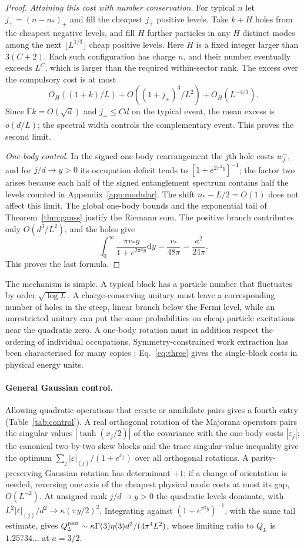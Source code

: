 \documentclass[11pt,a4paper]{article}
\theoremstyle{remark}
\newcommand{\E}{\mathbb E}
\newcommand{\dd}{\mathrm d}
\begin{document}
\begin{proof}
\emph{Attaining this cost with number conservation.} For typical $n$ let $j_+=(n-n_*)_+$ and fill the cheapest $j_+$ positive levels. Take $k+H$ holes from the cheapest negative levels, and fill $H$ further particles in any $H$ distinct modes among the next $\lfloor L^{1/3}\rfloor$ cheap positive levels. Here $H$ is a fixed integer larger than $3(C+2)$. Each such configuration has charge $n$, and their number eventually exceeds $L^C$, which is larger than the required within-sector rank. The excess over the compulsory cost is at most
\[
 O_H((1+k)/L)+O((1+j_+)^3/L^2)+O_H(L^{-4/3}).
\]
Since $\E k=O(\sqrt d)$ and $j_+\le Cd$ on the typical event, the mean excess is $o(d/L)$; the spectral width controls the complementary event. This proves the second limit.

\emph{One-body control.} In the signed one-body rearrangement the $j$th hole costs $w_j^-$, and for $j/d\to y>0$ its occupation deficit tends to $[1+e^{2\pi^2 y}]^{-1}$; the factor two arises because each half of the signed entanglement spectrum contains half the levels counted in Appendix~\ref{app:modular}. The shift $n_*-L/2=O(1)$ does not affect this limit. The global one-body bounds and the exponential tail of Theorem~\ref{thm:gauss} justify the Riemann sum. The positive branch contributes only $O(d^3/L^2)$, and the holes give
\[
 \int_0^\infty\frac{\pi v_* y}{1+e^{2\pi^2 y}}\dd y=\frac{v_*}{48\pi}=\frac{a^2}{24\pi}.
\]
This proves the last formula.
\end{proof}

The mechanism is simple. A typical block has a particle number that fluctuates by order $\sqrt{\log L}$. A charge-conserving unitary must leave a corresponding number of holes in the steep, linear branch below the Fermi level, while an unrestricted unitary can put the same probabilities on cheap particle excitations near the quadratic zero. A one-body rotation must in addition respect the ordering of individual occupations. Symmetry-constrained work extraction has been characterised for many copies \cite{mitsu}; Eq.~\eqref{eq:three} gives the single-block costs in physical energy units.

\paragraph{General Gaussian control.} Allowing quadratic operations that create or annihilate pairs gives a fourth entry (Table~\ref{tab:control}). A real orthogonal rotation of the Majorana operators pairs the singular values $|\tanh(x_j/2)|$ of the covariance with the one-body costs $|\varepsilon_j|$; the canonical two-by-two skew blocks and the trace singular-value inequality give the optimum $\sum_j |\varepsilon|_{(j)}/(1+e^{x_j})$ over all orthogonal rotations. A parity-preserving Gaussian rotation has determinant $+1$; if a change of orientation is needed, reversing one axis of the cheapest physical mode costs at most its gap, $O(L^{-2})$. At unsigned rank $j/d\to y>0$ the quadratic levels dominate, with $L^2 |\varepsilon|_{(j)}/d^2\to\kappa(\pi y/2)^2$. Integrating against $(1+e^{\pi^2 y})^{-1}$, with the same tail estimate, gives $Q_L^{\rm pair}\sim\kappa\Gamma(3)\eta(3)d^3/(4\pi^4L^2)$, whose limiting ratio to $Q_L$ is $1.25734\ldots$ at $a=3/2$.
\end{document}
